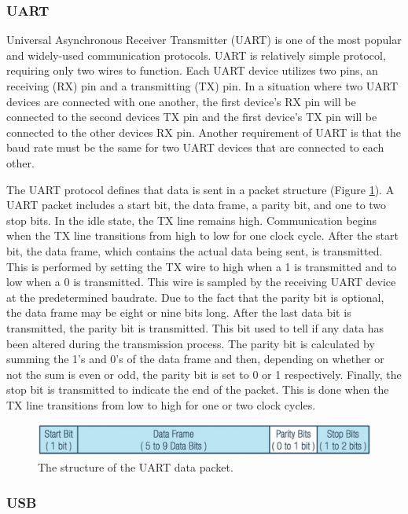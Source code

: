 \subsubsection{UART}
Universal Asynchronous Receiver Transmitter (UART) is one of the most popular and widely-used communication protocols. UART is relatively simple protocol, requiring only two wires to function. Each UART device utilizes two pins, an receiving (RX) pin and a transmitting (TX) pin. In a situation where two UART devices are connected with one another, the first device's RX pin will be connected to the second devices TX pin and the first device's TX pin will be connected to the other devices RX pin. Another requirement of UART is that the baud rate must be the same for two UART devices that are connected to each other.

The UART protocol defines that data is sent in a packet structure (Figure \ref{fig:uart-data-packet}). A UART packet includes a start bit, the data frame, a parity bit, and one to two stop bits. In the idle state, the TX line remains high. Communication begins when the TX line transitions from high to low for one clock cycle. After the start bit, the data frame, which contains the actual data being sent, is transmitted. This is performed by setting the TX wire to high when a 1 is transmitted and to low when a 0 is transmitted. This wire is sampled by the receiving UART device at the predetermined baudrate. Due to the fact that the parity bit is optional, the data frame may be eight or nine bits long. After the last data bit is transmitted, the parity bit is transmitted. This bit used to tell if any data has been altered during the transmission process. The parity bit is calculated by summing the 1's and 0's of the data frame and then, depending on whether or not the sum is even or odd, the parity bit is set to 0 or 1 respectively. Finally, the stop bit is transmitted to indicate the end of the packet. This is done when the TX line transitions from low to high for one or two clock cycles.

\begin{figure}
    \centering
    \includegraphics[width=6in]{figures/uart-data-packet.png}
    \caption{The structure of the UART data packet.}
    \label{fig:uart-data-packet}
\end{figure}

\subsubsection{USB}
